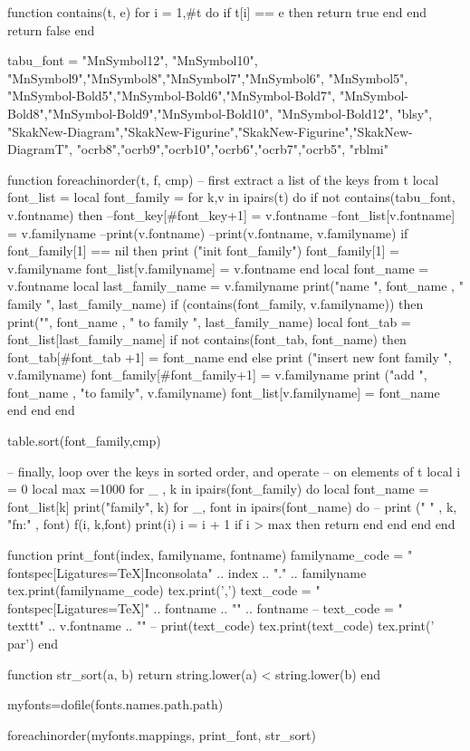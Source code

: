 \documentclass[12pt,a4paper]{article}
\author{Hong Phuc Bui}
\date{27.06.2013}
\begin{document}
\begin{luacode}

function contains(t, e)
	for i = 1,#t do
		if t[i] == e then return true end
	end
	return false
end

tabu_font = {
"MnSymbol12", "MnSymbol10", "MnSymbol9","MnSymbol8","MnSymbol7","MnSymbol6", "MnSymbol5",
"MnSymbol-Bold5","MnSymbol-Bold6","MnSymbol-Bold7", "MnSymbol-Bold8","MnSymbol-Bold9","MnSymbol-Bold10", "MnSymbol-Bold12",
"blsy",
"SkakNew-Diagram","SkakNew-Figurine","SkakNew-Figurine","SkakNew-DiagramT",
"ocrb8","ocrb9","ocrb10","ocrb6","ocrb7","ocrb5",
"rblmi"}

function foreachinorder(t, f, cmp)
    -- first extract a list of the keys from t
    local font_list = {}
    local font_family = {}
    for k,v in ipairs(t) do
		if not contains(tabu_font, v.fontname) then
			--font_key[#font_key+1] = v.fontname
			--font_list[v.fontname] = v.familyname
			--print(v.fontname)
			--print(v.fontname, v.familyname)
			if font_family[1] == nil then
				print ("init font_family")
				font_family[1] = v.familyname
				font_list[v.familyname] = {v.fontname}
			end
			local font_name = v.fontname
			local last_family_name = v.familyname
			print("name ", font_name , " family ", last_family_name)
			if (contains(font_family, v.familyname)) then
				print("", font_name , " to family ", last_family_name)
				local font_tab = font_list[last_family_name]
				if not contains(font_tab, font_name) then
					font_tab[#font_tab +1] = font_name
				end
			else
				print ("insert new font family ", v.familyname)
				font_family[#font_family+1] = v.familyname
				print ("add ", font_name , "to family", v.familyname)
				font_list[v.familyname] = {font_name}
			end
		end
    end
    
    table.sort(font_family,cmp)
    
    -- finally, loop over the keys in sorted order, and operate
    -- on elements of t
    local i = 0
    local max =1000
    for _ , k in ipairs(font_family) do
		local font_name = font_list[k]
		print("family", k)
		for _, font in ipairs(font_name) do
			-- print (" " , k, "fn:" , font)
			f(i, k,font)
			print(i)
			i = i + 1
			if i > max then 
				return
			end
		end
    end
end

function print_font(index, familyname, fontname)
	familyname_code = "\\fontspec[Ligatures=TeX]{Inconsolata}" .. index .. "." .. familyname
	tex.print(familyname_code)
	tex.print(',')
	text_code =  "\\fontspec[Ligatures=TeX]{" .. fontname .. "}" .. fontname
	-- text_code =  "\\texttt{" .. v.fontname .. "}"
	-- print(text_code)
	tex.print(text_code)
	tex.print('\\par')
end

function str_sort(a, b)
	return string.lower(a) < string.lower(b)
end
\end{luacode}

\begin{luacode}

myfonts=dofile(fonts.names.path.path)

foreachinorder(myfonts.mappings, print_font, str_sort)


\end{luacode}
\end{document}

